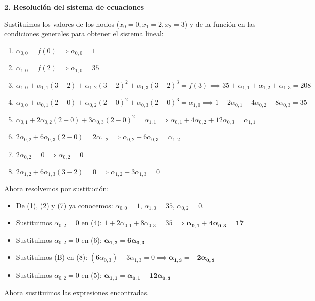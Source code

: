 \documentclass{article}
\begin{document}
\textbf{2. Resolución del sistema de ecuaciones}

Sustituimos los valores de los nodos ($x_0=0, x_1=2, x_2=3$) y de la función en las condiciones generales para obtener el sistema lineal:
\begin{enumerate}
    \item $\alpha_{0,0} = f(0) \implies \alpha_{0,0} = 1$
    \item $\alpha_{1,0} = f(2) \implies \alpha_{1,0} = 35$
    \item $\alpha_{1,0} + \alpha_{1,1}(3-2) + \alpha_{1,2}(3-2)^2 + \alpha_{1,3}(3-2)^3 = f(3) \implies 35 + \alpha_{1,1} + \alpha_{1,2} + \alpha_{1,3} = 208$
    \item $\alpha_{0,0} + \alpha_{0,1}(2-0) + \alpha_{0,2}(2-0)^2 + \alpha_{0,3}(2-0)^3 = \alpha_{1,0} \implies 1 + 2\alpha_{0,1} + 4\alpha_{0,2} + 8\alpha_{0,3} = 35$
    \item $\alpha_{0,1} + 2\alpha_{0,2}(2-0) + 3\alpha_{0,3}(2-0)^2 = \alpha_{1,1} \implies \alpha_{0,1} + 4\alpha_{0,2} + 12\alpha_{0,3} = \alpha_{1,1}$
    \item $2\alpha_{0,2} + 6\alpha_{0,3}(2-0) = 2\alpha_{1,2} \implies \alpha_{0,2} + 6\alpha_{0,3} = \alpha_{1,2}$
    \item $2\alpha_{0,2} = 0 \implies \alpha_{0,2} = 0$
    \item $2\alpha_{1,2} + 6\alpha_{1,3}(3-2) = 0 \implies \alpha_{1,2} + 3\alpha_{1,3} = 0$
\end{enumerate}

Ahora resolvemos por sustitución:
\begin{itemize}
    \item De (1), (2) y (7) ya conocemos: $\alpha_{0,0} = 1$, $\alpha_{1,0} = 35$, $\alpha_{0,2} = 0$.
    \item Sustituimos $\alpha_{0,2}=0$ en (4): $1 + 2\alpha_{0,1} + 8\alpha_{0,3} = 35 \implies \boldsymbol{\alpha_{0,1} + 4\alpha_{0,3} = 17}$
    \item Sustituimos $\alpha_{0,2}=0$ en (6): $\boldsymbol{\alpha_{1,2} = 6\alpha_{0,3}}$
    \item Sustituimos (B) en (8): $(6\alpha_{0,3}) + 3\alpha_{1,3} = 0 \implies \boldsymbol{\alpha_{1,3} = -2\alpha_{0,3}}$
    \item Sustituimos $\alpha_{0,2}=0$ en (5): $\boldsymbol{\alpha_{1,1} = \alpha_{0,1} + 12\alpha_{0,3}}$
\end{itemize}

Ahora sustituimos las expresiones encontradas.
\end{document}
